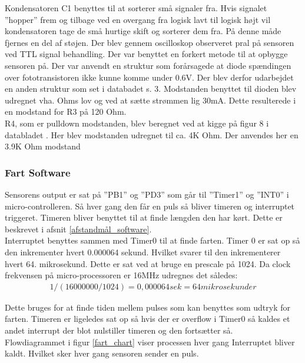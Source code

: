 Kondensatoren C1 benyttes til at sorterer små signaler fra. Hvis signalet ”hopper” frem og tilbage ved en overgang fra logisk lavt til logisk højt vil kondensatoren tage de små hurtige skift og sorterer dem fra. På denne måde fjernes en del af støjen.  
Der blev gennem oscilloskop observeret pral på sensoren ved TTL signal behandling. Der var benyttet en forkert metode til at opbygge sensoren på. Der var anvendt en struktur som forårsagede at diode spændingen over fototransistoren ikke kunne komme under 0.6V. Der blev derfor udarbejdet en anden struktur som set i databadet s. 3.  Modstanden benyttet til dioden blev udregnet vha. Ohms lov og ved at sætte strømmen lig 30mA. Dette resulterede i en modstand for R3 på 120 Ohm. \\

R4, som er pulldown modstanden, blev beregnet ved at kigge på figur 8 i databladet . Her blev modstanden udregnet til ca. 4K Ohm. Der anvendes her en 3.9K Ohm modstand \\

\subsubsection{Fart Software}
\label{fartmål_software}
Sensorens output er sat på ”PB1” og ”PD3” som går til ”Timer1” og ”INT0” i micro-controlleren. Så hver gang den får en puls så bliver timeren og interruptet triggeret. Timeren bliver benyttet til at finde længden den har kørt. Dette er beskrevet i afsnit \ref{afstandmål_software}. \\

Interruptet benyttes sammen med Timer0 til at finde farten. Timer 0 er sat op så den inkrementer hvert 0.000064 sekund. Hvilket svarer til den inkrementerer hvert 64. mikrosekund. Dette er sat ved at bruge en prescale på 1024. Da clock frekvensen på micro-processoren er 16MHz udregnes det således: \\
\begin{align*}
1/(16 000 000 / 1024) = 0,000064 sek = 64 mikrosekunder 
\end{align*}

Dette bruges for at finde tiden mellem pulses som kan benyttes som udtryk for farten. Timeren er ligeledes sat op så hvis der er overflow i Timer0 så kaldes et andet interrupt der blot nulstiller timeren og den fortsætter så. \\

Flowdiagrammet i figur \ref{fart_chart} viser processen hver gang Interruptet bliver kaldt. Hvilket sker hver gang sensoren sender en puls. \\

